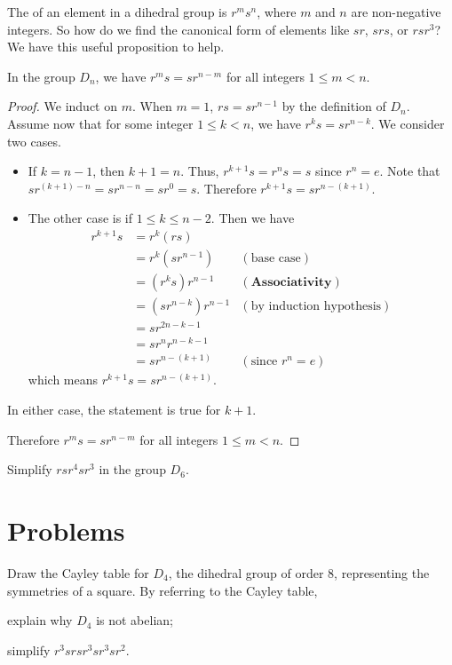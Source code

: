 The  of an element in a dihedral group is $r^ms^n$, where $m$ and $n$ are non-negative integers. So how do we find the canonical form of elements like $sr$, $srs$, or $rsr^3$? We have this useful proposition to help.
\begin{proposition}\label{prop-Dn-cannonical-form}
    In the group $D_n$, we have $r^ms = sr^{n-m}$ for all integers $1 \leq m < n$.
\end{proposition}
\begin{proof}
    We induct on $m$. When $m = 1$, $rs = sr^{n-1}$ by the definition of $D_n$. Assume now that for some integer $1 \leq k < n$, we have $r^ks = sr^{n-k}$. We consider two cases.
    \begin{itemize}
        \item If $k = n - 1$, then $k + 1 = n$. Thus, $r^{k+1}s = r^ns = s$ since $r^n = e$. Note that $sr^{(k+1)-n} = sr^{n-n} = sr^0 = s$. Therefore $r^{k+1}s = sr^{n-(k+1)}$.
        \item The other case is if $1 \leq k \leq n - 2$. Then we have
        \begin{align*}
            r^{k+1}s &= r^k(rs)\\
            &= r^k(sr^{n-1}) & (\text{base case})\\
            &= (r^ks)r^{n-1} & (\textbf{Associativity})\\
            &= (sr^{n-k})r^{n-1} & (\text{by induction hypothesis})\\
            &= sr^{2n - k - 1}\\
            &= sr^nr^{n-k-1}\\
            &= sr^{n-(k+1)} & (\text{since } r^n = e)
        \end{align*}
        which means $r^{k+1}s = sr^{n-(k+1)}$.
    \end{itemize}
    In either case, the statement is true for $k+1$.

    Therefore $r^ms = sr^{n-m}$ for all integers $1 \leq m < n$.
\end{proof}

\begin{exercise}
    Simplify $rsr^4sr^3$ in the group $D_6$.
\end{exercise}



\section{Problems}
\begin{problem}
    Draw the Cayley table for $D_4$, the dihedral group of order 8, representing the symmetries of a square.\newline
    By referring to the Cayley table,
    \begin{partquestions}{\alph*}
        \item explain why $D_4$ is not abelian;
        \item simplify $r^3srsr^3sr^3sr^2$.
    \end{partquestions}
\end{problem}

